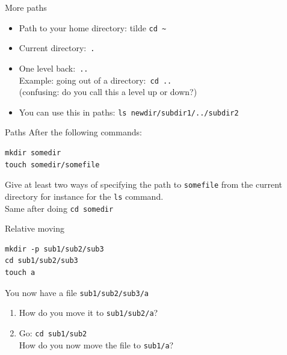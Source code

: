 \documentclass[11pt,headernav]{beamer}
\begin{document}

\begin{numberedframe}{More paths}
  \label{sl-lnx:morepath}
  \begin{itemize}
  \item Path to your home directory: tilde
    \lstinline{cd ~}
  \item Current directory:~\lstinline{.}
  \item One level back:~\lstinline{..}\\
    Example: going out of a directory:~\lstinline{cd ..}\\
    (confusing: do you call this a level up or down?)
  \item You can use this in paths: \lstinline{ls newdir/subdir1/../subdir2}
  \end{itemize}
\end{numberedframe}



\begin{exerciseframe}{Paths}
  After the following commands:
\begin{lstlisting}
mkdir somedir
touch somedir/somefile
\end{lstlisting}
Give at least two ways of specifying the path to \lstinline{somefile}
from the current directory
for instance for the \lstinline{ls} command.\\
Same after doing \lstinline{cd somedir}
\end{exerciseframe}

\begin{exerciseframe}{Relative moving}
\begin{lstlisting}
mkdir -p sub1/sub2/sub3
cd sub1/sub2/sub3
touch a
\end{lstlisting}
You now have a file \lstinline{sub1/sub2/sub3/a}\\
\begin{enumerate}
\item
  How do you move it to \lstinline{sub1/sub2/a}?
\item Go: \lstinline{cd sub1/sub2}\\
  How do you now move the file to \lstinline{sub1/a}?
\end{enumerate}
\end{exerciseframe}
\end{document}
